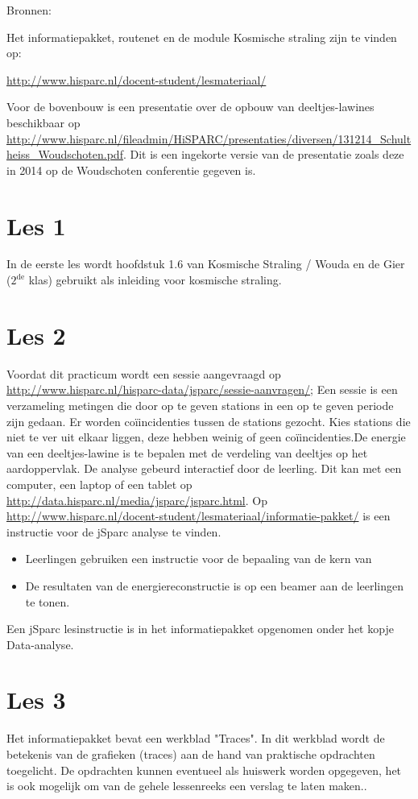 Bronnen:

Het informatiepakket, routenet en de module Kosmische straling zijn te vinden op:

\url{http://www.hisparc.nl/docent-student/lesmateriaal/}

Voor de bovenbouw is een presentatie over de opbouw van deeltjes-lawines beschikbaar op \url{http://www.hisparc.nl/fileadmin/HiSPARC/presentaties/diversen/131214_Schultheiss_Woudschoten.pdf}. Dit is een ingekorte versie van de presentatie zoals deze in 2014 op de Woudschoten conferentie gegeven is.

\section{Les 1}

In de eerste les wordt hoofdstuk 1.6 van Kosmische Straling / Wouda en de Gier ($2^{\mathrm{de}}$ klas) gebruikt als inleiding voor kosmische straling.

\section{Les 2}

Voordat dit practicum wordt een sessie aangevraagd op \url{http://www.hisparc.nl/hisparc-data/jsparc/sessie-aanvragen/}; Een sessie is een verzameling metingen die door op te geven stations in een op te geven periode zijn gedaan. Er worden co\"{i}incidenties tussen de stations gezocht. Kies stations die niet te ver uit elkaar liggen, deze hebben weinig of geen co\"{i}incidenties.De energie van een deeltjes-lawine is te bepalen met de verdeling van deeltjes op het aardoppervlak. De analyse gebeurd interactief door de leerling. Dit kan met een computer, een laptop of een tablet op \url{http://data.hisparc.nl/media/jsparc/jsparc.html}. Op \url{http://www.hisparc.nl/docent-student/lesmateriaal/informatie-pakket/} is een instructie voor de jSparc analyse te vinden. 

\begin{itemize}
\item Leerlingen gebruiken een instructie voor de bepaaling van de kern van
\item De resultaten van de energiereconstructie is op een beamer aan de leerlingen te tonen.
\end{itemize}

Een jSparc lesinstructie is in het informatiepakket opgenomen onder het kopje Data-analyse.


\section{Les 3}
Het informatiepakket bevat een werkblad "Traces". In dit werkblad wordt de betekenis van de grafieken (traces) aan de hand van praktische opdrachten toegelicht. De opdrachten kunnen eventueel als huiswerk worden opgegeven, het is ook mogelijk om van de gehele lessenreeks een verslag te laten maken..

